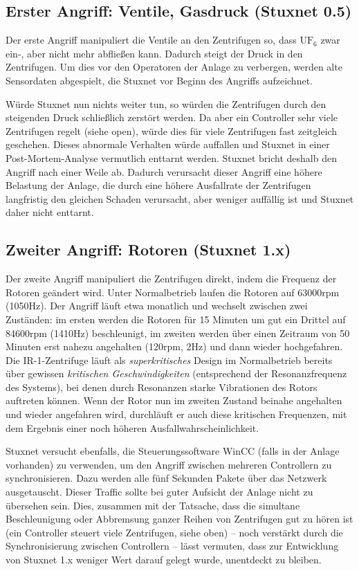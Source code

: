 \documentclass[a4paper]{article}
\begin{document}
\subsection{Erster Angriff: Ventile, Gasdruck (Stuxnet 0.5)}

Der erste Angriff manipuliert die Ventile an den Zentrifugen so,
dass $\mathrm{UF}_6$ zwar ein-, aber nicht mehr abfließen kann.
Dadurch steigt der Druck in den Zentrifugen.
Um dies vor den Operatoren der Anlage zu verbergen,
werden alte Sensordaten abgespielt, die Stuxnet vor Beginn des Angriffs aufzeichnet.

Würde Stuxnet nun nichts weiter tun, so würden die Zentrifugen durch den steigenden Druck schließlich zerstört werden.
Da aber ein Controller sehr viele Zentrifugen regelt (siehe open), würde dies für viele Zentrifugen fast zeitgleich geschehen.
Dieses abnormale Verhalten würde auffallen und Stuxnet in einer Post-Mortem-Analyse vermutlich enttarnt werden.
Stuxnet bricht deshalb den Angriff nach einer Weile ab.
Dadurch verursacht dieser Angriff eine höhere Belastung der Anlage,
die durch eine höhere Ausfallrate der Zentrifugen langfristig den gleichen Schaden verursacht,
aber weniger auffällig ist und Stuxnet daher nicht enttarnt.

\subsection{Zweiter Angriff: Rotoren (Stuxnet 1.x)}

Der zweite Angriff manipuliert die Zentrifugen direkt, indem die Frequenz der Rotoren geändert wird.
Unter Normalbetrieb laufen die Rotoren auf 63000rpm (1050Hz).
Der Angriff läuft etwa monatlich und wechselt zwischen zwei Zu\-stän\-den:
im ersten werden die Rotoren für 15 Minuten um gut ein Drittel auf 84600rpm (1410Hz) beschleunigt,
im zweiten werden über einen Zeitraum von 50 Minuten erst nahezu angehalten (120rpm, 2Hz) und dann wieder hochgefahren.
Die IR-1-Zentrifuge läuft als \emph{superkritisches} Design im Normalbetrieb bereits über gewissen \emph{kritischen Geschwindigkeiten}
(entsprechend der Resonanzfrequenz des Systems), bei denen durch Resonanzen starke Vibrationen des Rotors auftreten können.
Wenn der Rotor nun im zweiten Zustand beinahe angehalten und wieder angefahren wird,
durchläuft er auch diese kritischen Frequenzen, mit dem Ergebnis einer noch höheren Ausfallwahrscheinlichkeit.

Stuxnet versucht ebenfalls, die Steuerungssoftware WinCC (falls in der Anlage vorhanden) zu verwenden, um den Angriff zwischen mehreren Controllern zu synchronisieren.\cite{dossier}
Dazu werden alle fünf Sekunden Pakete über das Netzwerk ausgetauscht.
Dieser Traffic sollte bei guter Aufsicht der Anlage nicht zu übersehen sein.
Dies, zusammen mit der Tatsache, dass die simultane Beschleunigung oder Abbremsung ganzer Reihen von Zentrifugen gut zu hören ist
(ein Controller steuert viele Zentrifugen, siehe oben) – noch verstärkt durch die Synchronisierung zwischen Controllern –
lässt vermuten, dass zur Entwicklung von Stuxnet 1.x weniger Wert darauf gelegt wurde, unentdeckt zu bleiben.
\end{document}
